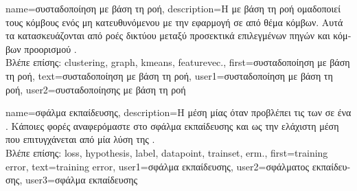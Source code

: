 {name={\foreignlanguage{greek}{συσταδοποίηση με βάση τη ροή}},
	description={\foreignlanguage{greek}{Η}  
		\foreignlanguage{greek}{με βάση τη ροή ομαδοποιεί τους κόμβους ενός μη κατευθυνόμενου}  
		 \foreignlanguage{greek}{με την εφαρμογή}   \foreignlanguage{greek}{σε}  
		 \foreignlanguage{greek}{από θέμα κόμβων. Αυτά τα}  \foreignlanguage{greek}{κατασκευάζονται 
		από ροές δικτύου μεταξύ προσεκτικά επιλεγμένων πηγών και κόμβων προορισμού} \cite{FlowSpecClustering2021}.\\
		\foreignlanguage{greek}{Βλέπε επίσης:} \gls{clustering}, \gls{graph}, \gls{kmeans}, \gls{featurevec}.}, 
	first={\foreignlanguage{greek}{συσταδοποίηση με βάση τη ροή}},
	text={\foreignlanguage{greek}{συσταδοποίηση με βάση τη ροή}},
	user1={\foreignlanguage{greek}{συσταδοποίηση με βάση τη ροή}}, %
    	user2={\foreignlanguage{greek}{συσταδοποίησης με βάση τη ροή}} %
}

{name={\foreignlanguage{greek}{σφάλμα εκπαίδευσης}},
	description={\foreignlanguage{greek}{Η μέση}  \foreignlanguage{greek}{μίας} 
		 \foreignlanguage{greek}{όταν προβλέπει τις}  \foreignlanguage{greek}{των} 
		 \foreignlanguage{greek}{σε ένα} . 
		\foreignlanguage{greek}{Κάποιες φορές αναφερόμαστε στο σφάλμα εκπαίδευσης και ως την ελάχιστη μέση}  
		\foreignlanguage{greek}{που επιτυγχάνεται από μία λύση της} .\\
		\foreignlanguage{greek}{Βλέπε επίσης:} \gls{loss}, \gls{hypothesis}, \gls{label}, \gls{datapoint}, \gls{trainset}, \gls{erm}.},
	first={training error},
	text={training error},
	user1={\foreignlanguage{greek}{σφάλμα εκπαίδευσης}}, %
  	user2={\foreignlanguage{greek}{σφάλματος εκπαίδευσης}}, %
	user3={\foreignlanguage{greek}{σφάλμα εκπαί\-δευσης}} %
}

